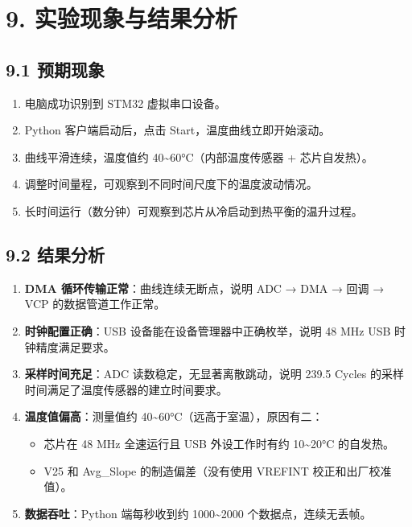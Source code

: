 \documentclass[
  chinese,
  UTF8,
  oneside,
  openany]{ctexbook}
\providecommand{\tightlist}{%
  \setlength{\itemsep}{0pt}\setlength{\parskip}{0pt}}
\begin{document}
\section{9.
实验现象与结果分析}\label{ux5b9eux9a8cux73b0ux8c61ux4e0eux7ed3ux679cux5206ux6790-2}

\subsection{9.1 预期现象}\label{ux9884ux671fux73b0ux8c61-4}

\begin{enumerate}
\def\labelenumi{\arabic{enumi}.}
\tightlist
\item
  电脑成功识别到 STM32 虚拟串口设备。
\item
  Python 客户端启动后，点击 Start，温度曲线立即开始滚动。
\item
  曲线平滑连续，温度值约 40\textasciitilde60°C（内部温度传感器 +
  芯片自发热）。
\item
  调整时间量程，可观察到不同时间尺度下的温度波动情况。
\item
  长时间运行（数分钟）可观察到芯片从冷启动到热平衡的温升过程。
\end{enumerate}

\subsection{9.2 结果分析}\label{ux7ed3ux679cux5206ux6790}

\begin{enumerate}
\def\labelenumi{\arabic{enumi}.}
\tightlist
\item
  \textbf{DMA 循环传输正常}：曲线连续无断点，说明 ADC → DMA → 回调 → VCP
  的数据管道工作正常。
\item
  \textbf{时钟配置正确}：USB 设备能在设备管理器中正确枚举，说明 48 MHz
  USB 时钟精度满足要求。
\item
  \textbf{采样时间充足}：ADC 读数稳定，无显著离散跳动，说明 239.5 Cycles
  的采样时间满足了温度传感器的建立时间要求。
\item
  \textbf{温度值偏高}：测量值约
  40\textasciitilde60°C（远高于室温），原因有二：

  \begin{itemize}
  \tightlist
  \item
    芯片在 48 MHz 全速运行且 USB 外设工作时有约 10\textasciitilde20°C
    的自发热。
  \item
    V25 和 Avg\_Slope 的制造偏差（没有使用 VREFINT 校正和出厂校准值）。
  \end{itemize}
\item
  \textbf{数据吞吐}：Python 端每秒收到约 1000\textasciitilde2000
  个数据点，连续无丢帧。
\end{enumerate}
\end{document}
